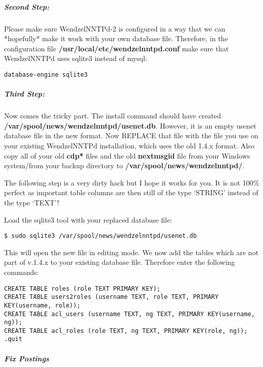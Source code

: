 \documentclass[12pt,fleqn,leqno]{scrbook}
\begin{document}
\hypertarget{second-step}{%
\subparagraph*{Second Step:}\label{second-step}}

Please make sure WendzelNNTPd-2 is configured in a way that we can
*hopefully* make it work with your own database file. Therefore, in the
configuration file \textbf{/usr/local/etc/wendzelnntpd.conf} make sure
that WendzelNNTPd uses sqlite3 instead of mysql:

\begin{verbatim}
database-engine sqlite3
\end{verbatim}

\hypertarget{third-step}{%
\subparagraph*{Third Step:}\label{third-step}}

Now comes the tricky part. The install command should have created
\textbf{/var/spool/news/wendzelnntpd/usenet.db}. However, it is an empty
usenet database file in the new format. Now REPLACE that file with the
file you use on your existing WendzelNNTPd installation, which uses the
old 1.4.x format. Also copy all of your old \textbf{cdp*} files and the
old \textbf{nextmsgid} file from your Windows system/from your backup
directory to \textbf{/var/spool/news/wendzelnntpd/}.

The following step is a very dirty hack but I hope it works for you. It
is not 100\% perfect as important table columns are then still of the
type `STRING' instead of the type `TEXT'!

Load the sqlite3 tool with your replaced database file:

\begin{verbatim}
$ sudo sqlite3 /var/spool/news/wendzelnntpd/usenet.db
\end{verbatim}

This will open the new file in editing mode. We now add the tables which
are not part of v.1.4.x to your existing database file. Therefore enter
the following commands:

\begin{verbatim}
CREATE TABLE roles (role TEXT PRIMARY KEY);
CREATE TABLE users2roles (username TEXT, role TEXT, PRIMARY KEY(username, role));
CREATE TABLE acl_users (username TEXT, ng TEXT, PRIMARY KEY(username, ng));
CREATE TABLE acl_roles (role TEXT, ng TEXT, PRIMARY KEY(role, ng));
.quit
\end{verbatim}

\hypertarget{fix-postings}{%
\subparagraph*{Fix Postings}\label{fix-postings}}
\end{document}
